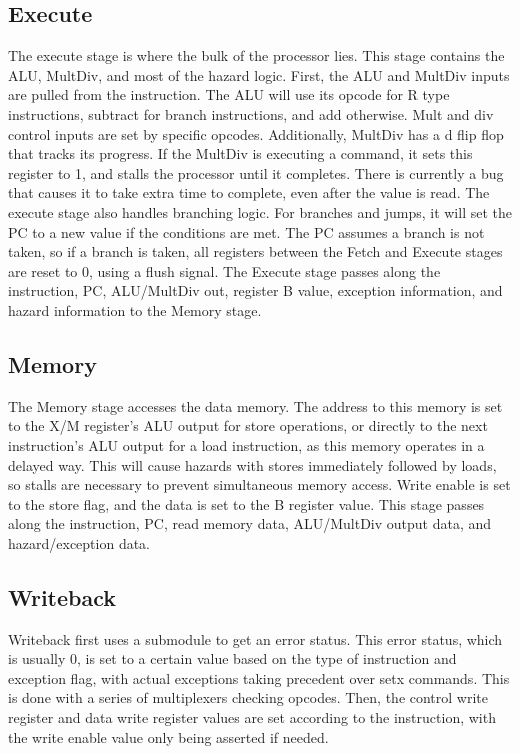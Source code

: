 \documentclass[letterpaper]{article} %
\begin{document}
\subsection*{Execute}
The execute stage is where the bulk of the processor lies. This stage contains the ALU, MultDiv, and most of the hazard logic. First, the ALU and MultDiv inputs are pulled from the instruction. The ALU will use its opcode for R type instructions, subtract for branch instructions, and add otherwise. Mult and div control inputs are set by specific opcodes. Additionally, MultDiv has a d flip flop that tracks its progress. If the MultDiv is executing a command, it sets this register to 1, and stalls the processor until it completes. There is currently a bug that causes it to take extra time to complete, even after the value is read. The execute stage also handles branching logic. For branches and jumps, it will set the PC to a new value if the conditions are met. The PC assumes a branch is not taken, so if a branch is taken, all registers between the Fetch and Execute stages are reset to 0, using a flush signal. The Execute stage passes along the instruction, PC, ALU/MultDiv out, register B value, exception information, and hazard information to the Memory stage. \\

\subsection*{Memory}
The Memory stage accesses the data memory. The address to this memory is set to the X/M register's ALU output for store operations, or directly to the next instruction's ALU output for a load instruction, as this memory operates in a delayed way. This will cause hazards with stores immediately followed by loads, so stalls are necessary to prevent simultaneous memory access. Write enable is set to the store flag, and the data is set to the B register value. This stage passes along the instruction, PC, read memory data, ALU/MultDiv output data, and hazard/exception data. \\

\subsection*{Writeback}
Writeback first uses a submodule to get an error status. This error status, which is usually 0, is set to a certain value based on the type of instruction and exception flag, with actual exceptions taking precedent over setx commands. This is done with a series of multiplexers checking opcodes. Then, the control write register and data write register values are set according to the instruction, with the write enable value only being asserted if needed. \\
\end{document}
